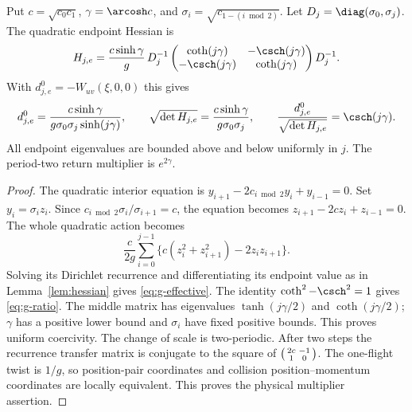 \begin{lemma}\label{lem:g-jacobi}
Put $c=\sqrt{c_0c_1}$, $\gamma=\arcosh c$, and
$\sigma_i=\sqrt{c_{1-(i\bmod2)}}$. Let
$D_j=\diag(\sigma_0,\sigma_j)$. The quadratic endpoint Hessian is
\begin{equation}\label{eq:g-effective}
 H_{j,e}=\frac{c\sinh\gamma}{g}\,
 D_j^{-1}
 \begin{pmatrix}\coth(j\gamma)&-\csch(j\gamma)\\
                 -\csch(j\gamma)&\coth(j\gamma)\end{pmatrix}D_j^{-1}.
\end{equation}
With $d^0_{j,e}=-W_{uv}(\xi,0,0)$ this gives
\begin{equation}\label{eq:g-ratio}
 d^0_{j,e}=\frac{c\sinh\gamma}{g\sigma_0\sigma_j\sinh(j\gamma)},
 \qquad \sqrt{\det H_{j,e}}=\frac{c\sinh\gamma}{g\sigma_0\sigma_j},
 \qquad \frac{d^0_{j,e}}{\sqrt{\det H_{j,e}}}=\csch(j\gamma).
\end{equation}
All endpoint eigenvalues are bounded above and below uniformly in $j$.
The period-two return multiplier is $e^{2\gamma}$.
\end{lemma}
\begin{proof}
The quadratic interior equation is
$y_{i+1}-2c_{i\bmod2}y_i+y_{i-1}=0$.
Set $y_i=\sigma_i z_i$. Since $c_{i\bmod2}\sigma_i/
\sigma_{i+1}=c$, the equation becomes
$z_{i+1}-2cz_i+z_{i-1}=0$. The whole quadratic action becomes
\[
 \frac c{2g}\sum_{i=0}^{j-1}
           \{c(z_i^2+z_{i+1}^2)-2z_i z_{i+1}\}.
\]
Solving its Dirichlet recurrence and differentiating its endpoint value
as in Lemma~\ref{lem:hessian} gives \eqref{eq:g-effective}.
The identity $\coth^2-\csch^2=1$ gives \eqref{eq:g-ratio}.
The middle matrix has eigenvalues $\tanh(j\gamma/2)$ and
$\coth(j\gamma/2)$; $\gamma$ has a positive lower bound and
$\sigma_i$ have fixed positive bounds. This proves uniform coercivity.
The change of scale is two-periodic. After two steps the recurrence
transfer matrix is conjugate to the square of
$\begin{psmallmatrix}2c&-1\\1&0\end{psmallmatrix}$.
The one-flight twist is $1/g$, so position-pair coordinates and collision
position--momentum coordinates are locally equivalent. This proves the
physical multiplier assertion.
\end{proof}

